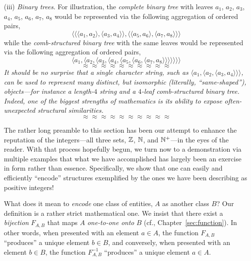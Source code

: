 \noindent
(iii) {\em Binary trees.}
%
For illustration, the {\em complete binary tree}
with leaves $a_1$, $a_2$, $a_3$, $a_4$, $a_5$, $a_6$, $a_7$, $a_8$
would be represented via the following aggregation of ordered pairs,
\[
\langle
\langle \langle a_1,  a_2 \rangle, \langle a_3,  a_4 \rangle \rangle,
\langle \langle a_5,  a_6 \rangle, \langle a_7,  a_8 \rangle \rangle
\rangle
\]
while the {\em comb-structured binary tree}
with the same leaves would be represented via the following
aggregation of ordered pairs,
\[
\langle a_1, \langle a_2, \langle a_3, \langle a_4, \langle a_5,
\langle a_6, \langle a_7, a_8 \rangle \rangle \rangle \rangle
\rangle \rangle \rangle
\]
\[ \approx \approx \approx \approx \approx \approx \approx \approx \approx \approx \]
{\em It should be no surprise that a single character string, such as
  $\langle a_1, \langle a_2, \langle a_3, a_4 \rangle \rangle
  \rangle$, can be used to represent many distinct, but {\em
    isomorphic} (literally, ``same-shaped''), objects---for instance a
  length-$4$ string and a $4$-leaf comb-structured binary tree.
  Indeed, one of the biggest strengths of mathematics is its ability
  to expose often-unexpected structural similarities.  }
\[ \approx \approx \approx \approx \approx \approx \approx \approx \approx \approx \]

\medskip

The rather long preamble to this section has been our attempt to
enhance the reputation of the integers---all three sets, $\mathbb{Z}$, $\mathbb{N}$,
and $\mathbb{N}^+$---in the eyes of the reader.  With that process hopefully
begun, we turn now to a demonstration via multiple examples that what
we have accomplished has largely been an exercise in form rather than
essence.  Specifically, we show that one can easily and efficiently
``encode'' structures exemplified by the ones we have been describing
as positive integers!

\medskip

\noindent
What does it mean to {\em encode}  one class of
  entities, $A$ as another class $B$?  Our definition is a rather
  strict mathematical one.  We insist that there exist a {\em
    bijection} $F_{A,B}$ that maps $A$ {\em one-to-one onto} $B$ (cf.,
  Chapter~\ref{sec:function}).  In other words, when presented with an
  element $a \in A$, the function $F_{A,B}$ ``produces'' a unique
  element $b \in B$, and conversely, when presented with an element $b
  \in B$, the function $F^{-1}_{A,B}$ ``produces'' a unique element $a
  \in A$.

